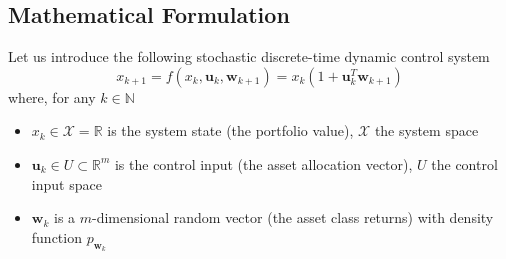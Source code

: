 \subsection{Mathematical Formulation}
 Let us introduce the following stochastic discrete-time dynamic control system
\begin{equation}
\label{eq:state_equation}
x_{k+1} = f(x_k,\bm{u}_k,\bm{w}_{k+1}) = x_k (1 + \bm{u}_k^T \bm{w}_{k+1}) 
\end{equation}
where, for any $k \in \mathbb{N}$
\begin{itemize}
	\item $x_k \in \mathcal{X} = \mathbb{R}$ is the system state (the portfolio value), $\mathcal{X}$ the system space
	\item $\bm{u}_k \in U \subset \mathbb{R}^m$ is the control input (the asset allocation vector), $U$ the control input space
	\item $\bm{w}_{k}$ is a $m$-dimensional random vector (the asset class returns) with density function $p_{\bm{w}_k}$
\end{itemize}

